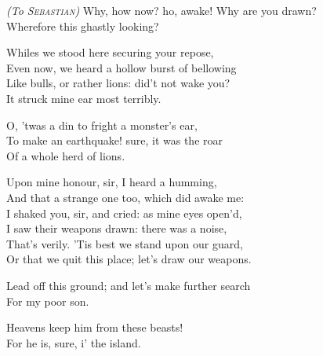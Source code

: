 \begin{verse_speech}[Alonso] 
\textit{(To \textsc{Sebastian})} Why, how now? ho, awake! Why are you drawn?\\
Wherefore this ghastly looking?
\end{verse_speech}


\begin{verse_speech}[Sebastian] 
Whiles we stood here securing your repose,\\
Even now, we heard a hollow burst of bellowing\\
Like bulls, or rather lions: did't not wake you?\\
It struck mine ear most terribly.
\end{verse_speech}


\begin{verse_speech}[Antonio] 
O, 'twas a din to fright a monster's ear,\\
To make an earthquake! sure, it was the roar\\
Of a whole herd of lions.
\end{verse_speech}

\begin{verse_speech}[Gonzalo] 
Upon mine honour, sir, I heard a humming,\\
And that a strange one too, which did awake me:\\
I shaked you, sir, and cried: as mine eyes open'd,\\
I saw their weapons drawn: there was a noise,\\
That's verily. 'Tis best we stand upon our guard,\\
Or that we quit this place; let's draw our weapons.
\end{verse_speech}

\begin{verse_speech}[Alonso] 
Lead off this ground; and let's make further search\\
For my poor son.
\end{verse_speech}

\begin{verse_speech}[Gonzalo] 
Heavens keep him from these beasts!\\
For he is, sure, i' the island.
\end{verse_speech}

